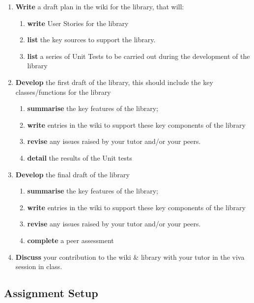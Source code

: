 \documentclass{../../fal_assignment}
\begin{document}
\begin{enumerate}[label=(\Alph*)]
    \item \textbf{Write} a draft plan in the wiki for the library, that will:
    	\begin{enumerate}[label=(\roman*)]
    		\item \textbf{write} User Stories for the library
    		\item \textbf{list} the key sources to support the library.
    		\item \textbf{list} a series of Unit Tests to be carried out during the development of the library
    	\end{enumerate}
    \item \textbf{Develop} the first draft of the library, this should include the key classes/functions for the library
    	\begin{enumerate}[label=(\roman*)]
    		\item \textbf{summarise} the key features of the library;
    		\item \textbf{write} entries in the wiki to support these key components of the library
    		\item \textbf{revise} any issues raised by your tutor and/or your peers.
    		\item \textbf{detail} the results of the Unit tests
    	\end{enumerate}
    \item \textbf{Develop} the final draft of the library
        \begin{enumerate}[label=(\roman*)]
    		\item \textbf{summarise} the key features of the library;
    		\item \textbf{write} entries in the wiki to support these key components of the library
    		\item \textbf{revise} any issues raised by your tutor and/or your peers.
    		\item \textbf{complete} a peer assessment
    	\end{enumerate}
    \item \textbf{Discuss} your contribution to the wiki \& library with your tutor in the viva session in class.
\end{enumerate}

\subsection*{Assignment Setup}
\end{document}
